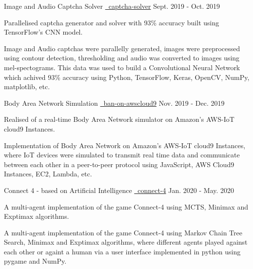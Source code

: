 \begin{cventries}
   \cvproject
    {Image and Audio Captcha Solver}
    {
    {}
    {\href{https://github.com/mukeshmk/image-audio-captcha}
    {\faGithubSquare\ captcha-solver}}
    }
    {Sept. 2019 - Oct. 2019}
    {
      \begin{cvitems}
      \vspace{-0.5ex}
        {
        \item {Parallelised captcha generator and solver with 93\% accuracy built using TensorFlow’s CNN model.}
        }
        {
        Image and Audio captchas were parallelly generated, images were preprocessed using contour detection, thresholding and audio was converted to images using mel-spectograms. This data was used to build a Convolutional Neural Network which achived 93\% accuracy using Python, TensorFlow, Keras, OpenCV, NumPy, matplotlib, etc.
        }
      \end{cvitems}
    }
  \cvproject
    {Body Area Network Simulation}
    {
    {}
    {\href{https://github.com/mukeshmk/ban-on-awscloud9}{\faGithubSquare\ ban-on-awscloud9}}
    }
    {Nov. 2019 - Dec. 2019}
    {
       \begin{cvitems}
       \vspace{-0.5ex}
        {
        \item{Realised of a real-time Body Area Network simulator on Amazon's AWS-IoT cloud9 Instances.}
        }
        {
        Implementation of Body Area Network on Amazon's AWS-IoT cloud9 Instances, where IoT devices were simulated to transmit real time data and communicate between each other in a peer-to-peer protocol using JavaScript, AWS Cloud9 Instances, EC2, Lambda, etc.
        }
      \end{cvitems}
    }
  \cvproject
    {Connect 4 - based on Artificial Intelligence}
    {
    {}
    {\href{https://github.com/mukeshmk/connect-4}{\faGithubSquare\ connect-4}}
    }
    {Jan. 2020 - May. 2020}
    {
      \begin{cvitems}
      \vspace{-0.5ex}
      {
      \item {A multi-agent implementation of the game Connect-4 using MCTS, Minimax and Exptimax algorithms.} 
      }
      {
      A multi-agent implementation of the game Connect-4 using Markov Chain Tree Search, Minimax and Exptimax algorithms, where different agents played against each other or againt a human via a user interface implemented in python using pygame and NumPy.
}
\end{cvitems}}
\end{cventries}
